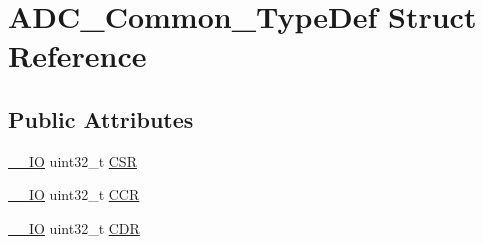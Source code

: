 \hypertarget{struct_a_d_c___common___type_def}{\section{A\-D\-C\-\_\-\-Common\-\_\-\-Type\-Def Struct Reference}
\label{struct_a_d_c___common___type_def}
}
\subsection*{Public Attributes}
\begin{DoxyCompactItemize}
\item 
\hyperlink{group___c_m_s_i_s__core__definitions_gaec43007d9998a0a0e01faede4133d6be}{\-\_\-\-\_\-\-I\-O} uint32\-\_\-t \hyperlink{struct_a_d_c___common___type_def_ac38e24f600f9e134a54a0c43b976a4f4}{C\-S\-R}
\item 
\hyperlink{group___c_m_s_i_s__core__definitions_gaec43007d9998a0a0e01faede4133d6be}{\-\_\-\-\_\-\-I\-O} uint32\-\_\-t \hyperlink{struct_a_d_c___common___type_def_aee6d4af7571a1bad2fec9e7b53733277}{C\-C\-R}
\item 
\hyperlink{group___c_m_s_i_s__core__definitions_gaec43007d9998a0a0e01faede4133d6be}{\-\_\-\-\_\-\-I\-O} uint32\-\_\-t \hyperlink{struct_a_d_c___common___type_def_a6f7399bf70f677ef5de46a3038f414e1}{C\-D\-R}
\end{DoxyCompactItemize}


